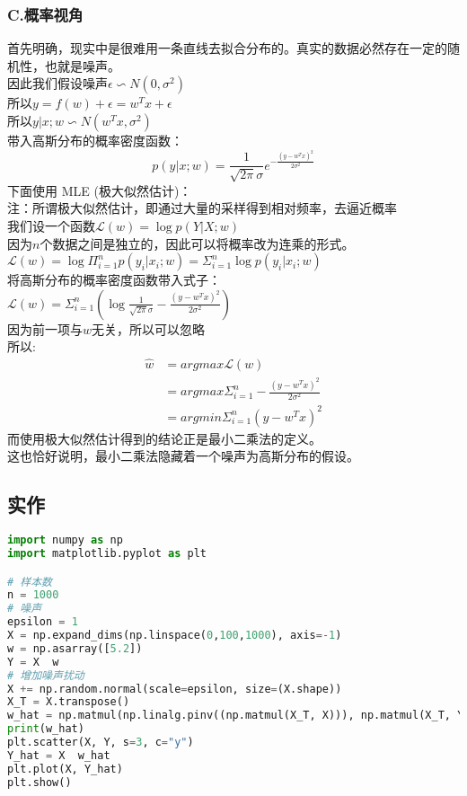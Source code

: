 \documentclass{report}
\begin{document}
\subsubsection{C.概率视角}
首先明确，现实中是很难用一条直线去拟合分布的。真实的数据必然存在一定的随机性，也就是噪声。\\
因此我们假设噪声$\epsilon\backsim N(0,\sigma^2)$\\
所以$y=f(w)+\epsilon=w^Tx+\epsilon$\\
所以$y|x;w\backsim N(w^Tx,\sigma^2)$\\
带入高斯分布的概率密度函数：
$$
p(y|x;w)=\frac{1}{\sqrt{2\pi}\sigma}e^{-\frac{(y-w^Tx)^2}{2\sigma^2}}
$$
下面使用 MLE (极大似然估计)：\\
注：所谓极大似然估计，即通过大量的采样得到相对频率，去逼近概率\\
我们设一个函数$\mathcal{L}(w)=\log{p(Y|X;w)}$\\
因为$n$个数据之间是独立的，因此可以将概率改为连乘的形式。\\
$\mathcal{L}(w)=\log{\Pi_{i=1}^np(y_i|x_i;w)}=\Sigma_{i=1}^n \log{p(y_i|x_i;w)}$\\
将高斯分布的概率密度函数带入式子：\\
$\mathcal{L}(w)=\Sigma_{i=1}^n(\log{\frac{1}{\sqrt{2\pi}\sigma}}-\frac{(y-w^Tx)^2}{2\sigma^2})$\\
因为前一项与$w$无关，所以可以忽略\\
所以:
$$
\begin{aligned}
\hat{w}
&=argmax \mathcal{L}(w)\\
&=argmax \Sigma_{i=1}^n -\frac{(y-w^Tx)^2}{2\sigma^2}\\
&=argmin \Sigma_{i=1}^n (y-w^Tx)^2
\end{aligned}
$$
而使用极大似然估计得到的结论正是最小二乘法的定义。\\
这也恰好说明，最小二乘法隐藏着一个噪声为高斯分布的假设。
\subsection{实作}
\begin{lstlisting}[language={python}]
%matplotlib inline
import numpy as np
import matplotlib.pyplot as plt

# 样本数
n = 1000
# 噪声
epsilon = 1
X = np.expand_dims(np.linspace(0,100,1000), axis=-1)
w = np.asarray([5.2])
Y = X  w
# 增加噪声扰动
X += np.random.normal(scale=epsilon, size=(X.shape))
X_T = X.transpose()
w_hat = np.matmul(np.linalg.pinv((np.matmul(X_T, X))), np.matmul(X_T, Y))
print(w_hat)
plt.scatter(X, Y, s=3, c="y")
Y_hat = X  w_hat
plt.plot(X, Y_hat)
plt.show()
\end{lstlisting}
\newpage
\end{document}
